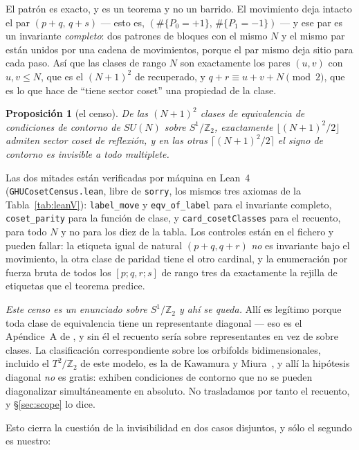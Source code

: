 \documentclass[11pt,a4paper]{article}
\newtheorem{proposition}{Proposición}
\newcommand{\ZZ}{\mathbb{Z}}
\begin{document}
\noindent El patrón es exacto, y es un teorema y no un barrido. El movimiento deja intacto el par
$(p+q,\,q+s)$ --- esto es, $(\#\{P_0=+1\},\,\#\{P_1=-1\})$ --- y ese par es un invariante
\emph{completo}: dos patrones de bloques con el mismo $N$ y el mismo par están unidos por una cadena
de movimientos, porque el par mismo deja sitio para cada paso. Así que las clases de rango $N$ son
exactamente los pares $(u,v)$ con $u,v\le N$, que es el $(N+1)^2$ de \cite{HHK} recuperado, y
$q+r\equiv u+v+N \pmod 2$, que es lo que hace de ``tiene sector coset'' una propiedad de la clase.

\begin{proposition}[el censo]\label{prop:census}
De las $(N+1)^2$ clases de equivalencia de condiciones de contorno de $SU(N)$ sobre $S^1/\ZZ_2$,
exactamente $\lfloor (N+1)^2/2\rfloor$ admiten sector coset de reflexión, y en las otras
$\lceil (N+1)^2/2\rceil$ el signo de contorno es invisible a \emph{todo} multiplete.
\end{proposition}

\noindent Las dos mitades están verificadas por máquina en Lean~4~\cite{Lean4}
(\texttt{GHUCosetCensus.lean}, libre de \texttt{sorry}, los mismos tres axiomas de la
Tabla~\ref{tab:leanV}): \texttt{label\_move} y \texttt{eqv\_of\_label} para el invariante completo,
\texttt{coset\_parity} para la función de clase, y \texttt{card\_cosetClasses} para el recuento,
para todo $N$ y no para los diez de la tabla. Los controles están en el fichero y pueden fallar: la
etiqueta igual de natural $(p+q,q+r)$ \emph{no} es invariante bajo el movimiento, la otra clase de
paridad tiene el otro cardinal, y la enumeración por fuerza bruta de todos los $[p;q,r;s]$ de rango
tres da exactamente la rejilla de etiquetas que el teorema predice.

\emph{Este censo es un enunciado sobre $S^1/\ZZ_2$ y ahí se queda.} Allí es legítimo porque toda
clase de equivalencia tiene un representante diagonal --- eso es el Apéndice~A de \cite{HHK}, y sin
él el recuento sería sobre representantes en vez de sobre clases. La clasificación correspondiente
sobre los orbifolds bidimensionales, incluido el $T^2/\ZZ_2$ de este modelo, es la de Kawamura y
Miura~\cite{KM}, y allí la hipótesis diagonal \emph{no} es gratis: exhiben condiciones de contorno
que no se pueden diagonalizar simultáneamente en absoluto. No trasladamos por tanto el recuento, y
\S\ref{sec:scope} lo dice.

Esto cierra la cuestión de la invisibilidad en dos casos disjuntos, y sólo el segundo es nuestro:
\end{document}
